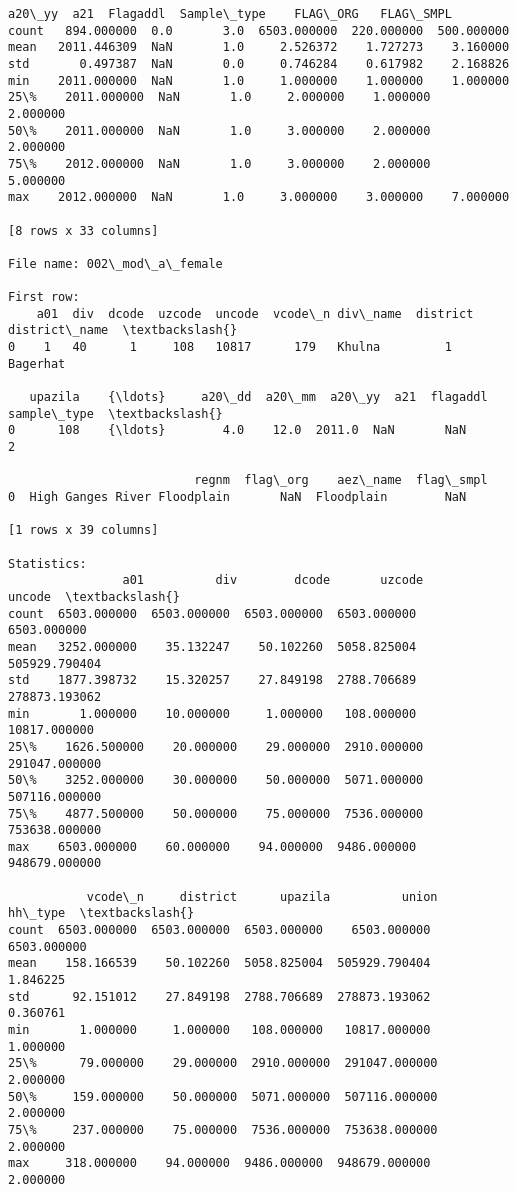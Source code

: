 \documentclass[11pt]{article}
\begin{document}
\begin{Verbatim}[commandchars=\\\{\}]
            a20\_yy  a21  Flagaddl  Sample\_type    FLAG\_ORG   FLAG\_SMPL  
count   894.000000  0.0       3.0  6503.000000  220.000000  500.000000  
mean   2011.446309  NaN       1.0     2.526372    1.727273    3.160000  
std       0.497387  NaN       0.0     0.746284    0.617982    2.168826  
min    2011.000000  NaN       1.0     1.000000    1.000000    1.000000  
25\%    2011.000000  NaN       1.0     2.000000    1.000000    2.000000  
50\%    2011.000000  NaN       1.0     3.000000    2.000000    2.000000  
75\%    2012.000000  NaN       1.0     3.000000    2.000000    5.000000  
max    2012.000000  NaN       1.0     3.000000    3.000000    7.000000  

[8 rows x 33 columns]

File name: 002\_mod\_a\_female

First row: 
    a01  div  dcode  uzcode  uncode  vcode\_n div\_name  district district\_name  \textbackslash{}
0    1   40      1     108   10817      179   Khulna         1      Bagerhat   

   upazila    {\ldots}     a20\_dd  a20\_mm  a20\_yy  a21  flagaddl  sample\_type  \textbackslash{}
0      108    {\ldots}        4.0    12.0  2011.0  NaN       NaN            2   

                          regnm  flag\_org    aez\_name  flag\_smpl  
0  High Ganges River Floodplain       NaN  Floodplain        NaN  

[1 rows x 39 columns]

Statistics: 
                a01          div        dcode       uzcode         uncode  \textbackslash{}
count  6503.000000  6503.000000  6503.000000  6503.000000    6503.000000   
mean   3252.000000    35.132247    50.102260  5058.825004  505929.790404   
std    1877.398732    15.320257    27.849198  2788.706689  278873.193062   
min       1.000000    10.000000     1.000000   108.000000   10817.000000   
25\%    1626.500000    20.000000    29.000000  2910.000000  291047.000000   
50\%    3252.000000    30.000000    50.000000  5071.000000  507116.000000   
75\%    4877.500000    50.000000    75.000000  7536.000000  753638.000000   
max    6503.000000    60.000000    94.000000  9486.000000  948679.000000   

           vcode\_n     district      upazila          union      hh\_type  \textbackslash{}
count  6503.000000  6503.000000  6503.000000    6503.000000  6503.000000   
mean    158.166539    50.102260  5058.825004  505929.790404     1.846225   
std      92.151012    27.849198  2788.706689  278873.193062     0.360761   
min       1.000000     1.000000   108.000000   10817.000000     1.000000   
25\%      79.000000    29.000000  2910.000000  291047.000000     2.000000   
50\%     159.000000    50.000000  5071.000000  507116.000000     2.000000   
75\%     237.000000    75.000000  7536.000000  753638.000000     2.000000   
max     318.000000    94.000000  9486.000000  948679.000000     2.000000   


\end{Verbatim}
\end{document}
